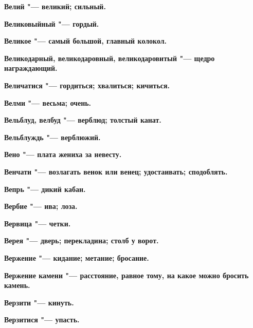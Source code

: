 \begin{multicols}{2}
\bfseries Велий\normalfont{} "--- великий; сильный. 




\bfseries Великовыйный\normalfont{} "--- гордый. 




\bfseries Великое\normalfont{} "--- самый большой, главный колокол. 




\bfseries Великодарный, великодаровный, великодаровитый\normalfont{} "--- щедро награждающий. 




\bfseries Величатися\normalfont{} "--- гордиться; хвалиться; кичиться. 




\bfseries Велми\normalfont{} "--- весьма; очень. 




\bfseries Вельблуд, велбуд\normalfont{} "--- верблюд; толстый канат. 




\bfseries Вельблуждь\normalfont{} "--- верблюжий. 




\bfseries Вено\normalfont{} "--- плата жениха за невесту. 




\bfseries Венчати\normalfont{} "--- возлагать венок или венец; удостаивать; сподоблять. 




\bfseries Вепрь\normalfont{} "--- дикий кабан. 




\bfseries Вербие\normalfont{} "--- ива; лоза. 




\bfseries Вервица\normalfont{} "--- четки. 




\bfseries Верея\normalfont{} "--- дверь; перекладина; столб у ворот. 




\bfseries Вержение\normalfont{} "--- кидание; метание; бросание. 




\bfseries Вержение камени\normalfont{} "--- расстояние, равное тому, на какое можно бросить камень. 




\bfseries Верзити\normalfont{} "--- кинуть. 




\bfseries Верзитися\normalfont{} "--- упасть. 





\end{multicols}
